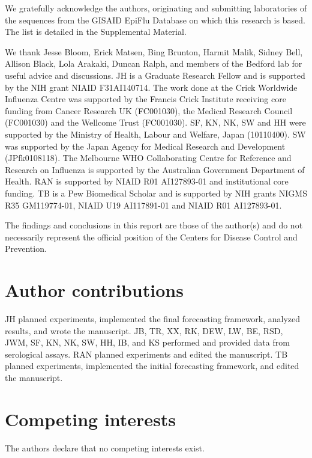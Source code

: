 We gratefully acknowledge the authors, originating and submitting laboratories of the sequences from the GISAID EpiFlu Database \cite{shu2017gisaid} on which this research is based. The list is detailed in the Supplemental Material.

We thank Jesse Bloom, Erick Matsen, Bing Brunton, Harmit Malik, Sidney Bell, Allison Black, Lola Arakaki, Duncan Ralph, and members of the Bedford lab for useful advice and discussions.
JH is a Graduate Research Fellow and is supported by the NIH grant NIAID F31AI140714.
The work done at the Crick Worldwide Influenza Centre was supported by the Francis Crick Institute receiving core funding from Cancer Research UK (FC001030), the Medical Research Council (FC001030) and the Wellcome Trust (FC001030).
SF, KN, NK, SW and HH were supported by the Ministry of Health, Labour and Welfare, Japan (10110400).
SW was supported by the Japan Agency for Medical Research and Development (JPfk0108118).
The Melbourne WHO Collaborating Centre for Reference and Research on Influenza is supported by the Australian Government Department of Health.
RAN is supported by NIAID R01 AI127893-01 and institutional core funding.
TB is a Pew Biomedical Scholar and is supported by NIH grants NIGMS R35 GM119774-01, NIAID U19 AI117891-01 and NIAID R01 AI127893-01.

The findings and conclusions in this report are those of the author(s) and do not necessarily represent the official position of the Centers for Disease Control and Prevention.

\section*{Author contributions}

JH planned experiments, implemented the final forecasting framework, analyzed results, and wrote the manuscript.
JB, TR, XX, RK, DEW, LW, BE, RSD, JWM, SF, KN, NK, SW, HH, IB, and KS performed and provided data from serological assays.
RAN planned experiments and edited the manuscript.
TB planned experiments, implemented the initial forecasting framework, and edited the manuscript.

\section*{Competing interests}

The authors declare that no competing interests exist.
